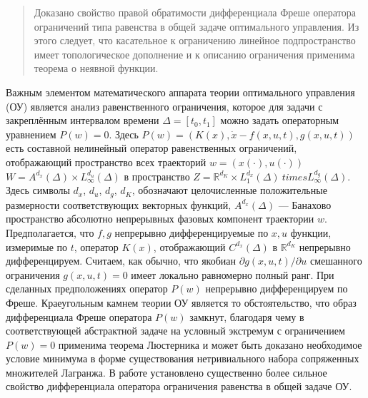 \begin{abstract}

Доказано свойство правой обратимости дифференциала Фреше оператора ограничений типа равенства в общей задаче оптимального управления. Из этого следует, что касательное к ограничению линейное подпространство имеет топологическое дополнение и к описанию ограничения применима теорема о неявной функции.

\end{abstract}


Важным  элементом математического аппарата теории оптимального управления (ОУ) является анализ равенственного ограничения, которое для задачи с закреплённым интервалом времени $\Delta=[t_0,t_1]$ можно задать операторным уравнением $P(w)=0$.
Здесь $P(w)=(K(x),\dot{x}-f(x,u,t),g(x,u,t))$
  есть составной нелинейный оператор равенственных ограничений, отображающий пространство всех траекторий $w=(x(\cdot),u(\cdot))$ $W=A^{d_x}(\Delta)\times L_{\infty}^{d_u}(\Delta)$
   в пространство $Z=\mathbb{R}^{d_K}\times L_1^{d_x}(\Delta)\ times L_{\infty}^{d_g}(\Delta)$.
  Здесь символы $d_x$, $d_u$, $d_g$, $d_K$,
 обозначают целочисленные положительные размерности соответствующих векторных функций, $A^{d_x}(\Delta)$ --- Банахово пространство абсолютно непрерывных фазовых компонент траектории $w$. Предполагается, что $f,g$  непрерывно дифференцируемые по $x,u$  функции, измеримые по $t$, оператор $K(x)$, отображающий $C^{d_x}(\Delta)$  в  $\mathbb{R}^{d_K}$ непрерывно дифференцируем. Считаем, как обычно, что якобиан $\partial g(x,u,t) / \partial u$ смешанного ограничения $g(x,u,t)=0$  имеет локально равномерно полный ранг. При сделанных предположениях оператор $P(w)$  непрерывно дифференцируем по Фреше. Краеугольным камнем теории ОУ \cite{Dub1}  является то обстоятельство, что образ дифференциала Фреше оператора $P(w)$ замкнут, благодаря чему в соответствующей абстрактной задаче на условный экстремум с ограничением $P(w)=0$  применима теорема Люстерника \cite{Dub2} и может быть доказано необходимое условие минимума в форме существования нетривиального набора сопряженных множителей Лагранжа. В работе установлено существенно более сильное свойство дифференциала оператора ограничения равенства в общей задаче ОУ.


